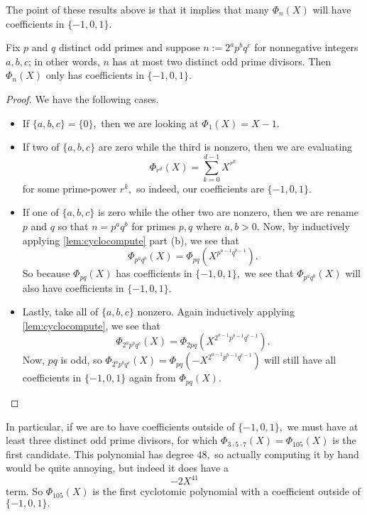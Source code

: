 The point of these results above is that it implies that many $\Phi_n(X)$ will have coefficients in $\{-1,0,1\}.$
\begin{exe}
	Fix $p$ and $q$ distinct odd primes and suppose $n:=2^ap^bq^c$ for nonnegative integers $a,b,c$; in other words, $n$ has at most two distinct odd prime divisors. Then $\Phi_n(X)$ only has coefficients in $\{-1,0,1\}.$
\end{exe}
\begin{proof}
	We have the following cases.
	\begin{itemize}
		\item If $\{a,b,c\}=\{0\},$ then we are looking at $\Phi_1(X)=X-1.$
		\item If two of $\{a,b,c\}$ are zero while the third is nonzero, then we are evaluating
		\[\Phi_{r^d}(X)=\sum_{k=0}^{d-1}X^{r^k}\]
		for some prime-power $r^k,$ so indeed, our coefficients are $\{-1,0,1\}.$
		\item If one of $\{a,b,c\}$ is zero while the other two are nonzero, then we are rename $p$ and $q$ so that $n=p^aq^b$ for primes $p,q$ where $a,b>0.$ Now, by inductively applying \autoref{lem:cyclocompute} part (b), we see that
		\[\Phi_{p^aq^b}(X)=\Phi_{pq}\left(X^{p^{a-1}q^{b-1}}\right).\]
		So because $\Phi_{pq}(X)$ has coefficients in $\{-1,0,1\},$ we see that $\Phi_{p^aq^b}(X)$ will also have coefficients in $\{-1,0,1\}.$
		\item Lastly, take all of $\{a,b,c\}$ nonzero. Again inductively applying \autoref{lem:cyclocompute}, we see that
		\[\Phi_{2^ap^bq^c}(X)=\Phi_{2pq}\left(X^{2^{a-1}p^{b-1}q^{c-1}}\right).\]
		Now, $pq$ is odd, so $\Phi_{2^ap^bq^c}(X)=\Phi_{pq}\left(-X^{2^{a-1}p^{b-1}q^{c-1}}\right)$ will still have all coefficients in $\{-1,0,1\}$ again from $\Phi_{pq}(X).$
		\qedhere
	\end{itemize}
\end{proof}
In particular, if we are to have coefficients outside of $\{-1,0,1\},$ we must have at least three distinct odd prime divisors, for which $\Phi_{3\cdot5\cdot7}(X)=\Phi_{105}(X)$ is the first candidate. This polynomial has degree $48,$ so actually computing it by hand would be quite annoying, but indeed it does have a
\[-2X^{41}\]
term. So $\boxed{\Phi_{105}(X)}$ is the first cyclotomic polynomial with a coefficient outside of $\{-1,0,1\}.$

